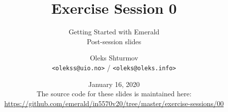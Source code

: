 \documentclass[xcolor=table]{beamer}
\title{{\Large Exercise Session 0}}
\subtitle{Getting Started with Emerald\\Post-session slides}
\institute{{University of Oslo}\\[0.2em] IN[59]570: Distributed Objects}
\author{Oleks Shturmov\\[-0.2em]%
  {\footnotesize \texttt{<olekss@uio.no>} / \texttt{<oleks@oleks.info>}}
}
\date{January 16, 2020\\[2em]
{\scriptsize The source code for these slides is maintained here: \\[-0.5em] {\tiny%
\url{https://github.com/emerald/in5570v20/tree/master/exercise-sessions/00}}%
}}
\begin{document}
\begin{frame} \titlepage \end{frame}




















\end{document}
